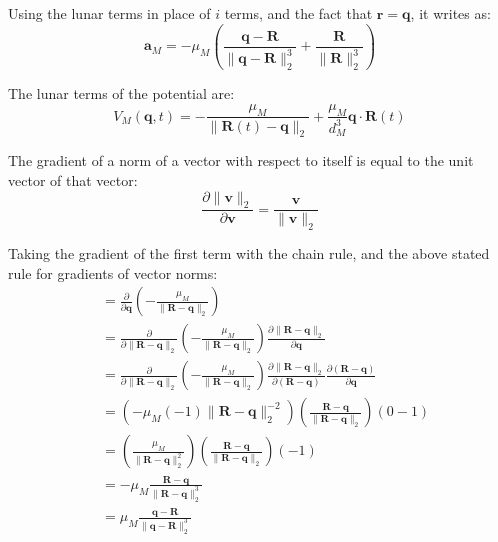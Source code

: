 \documentclass[titlepage]{article}
\begin{document}
Using the lunar terms in place of $i$ terms, and the fact that $\boldsymbol{r}=\boldsymbol{q}$, it writes as:
\begin{equation}
	\boldsymbol{a}_M=-\mu_M\left(\frac{\boldsymbol{q}-\boldsymbol{R}}{\|\boldsymbol{q}-\boldsymbol{R}\|_2^3}+\frac{\boldsymbol{R}}{\|\boldsymbol{R}\|_2^3}\right)
\end{equation}

The lunar terms of the potential are:
\begin{equation}
	V_M(\boldsymbol{q},t)=-\frac{\mu_M}{\|\boldsymbol{R}(t)-\boldsymbol{q}\|_2}+\frac{\mu_M}{d_M^3}\boldsymbol{q}\cdot\boldsymbol{R}(t)
\end{equation}

The gradient of a norm of a vector with respect to itself is equal to the unit vector of that vector:
\begin{equation}
	\frac{\partial\|\boldsymbol{v}\|_2}{\partial\boldsymbol{v}}=\frac{\boldsymbol{v}}{\|\boldsymbol{v}\|_2}
\end{equation}

Taking the gradient of the first term with the chain rule, and the above stated rule for gradients of vector norms:
\begin{equation}
	\begin{split}
		&=\frac{\partial}{\partial\boldsymbol{q}}\left(-\frac{\mu_M}{\|\boldsymbol{R}-\boldsymbol{q}\|_2}\right) \\
		&=\frac{\partial}{\partial\|\boldsymbol{R}-\boldsymbol{q}\|_2}\left(-\frac{\mu_M}{\|\boldsymbol{R}-\boldsymbol{q}\|_2}\right)\frac{\partial\|\boldsymbol{R}-\boldsymbol{q}\|_2}{\partial\boldsymbol{q}} \\
		&=\frac{\partial}{\partial\|\boldsymbol{R}-\boldsymbol{q}\|_2}\left(-\frac{\mu_M}{\|\boldsymbol{R}-\boldsymbol{q}\|_2}\right)\frac{\partial\|\boldsymbol{R}-\boldsymbol{q}\|_2}{\partial(\boldsymbol{R}-\boldsymbol{q})}\frac{\partial(\boldsymbol{R}-\boldsymbol{q})}{\partial\boldsymbol{q}} \\
		&=\left(-\mu_M(-1)\|\boldsymbol{R}-\boldsymbol{q}\|_2^{-2}\right)\left(\frac{\boldsymbol{R}-\boldsymbol{q}}{\|\boldsymbol{R}-\boldsymbol{q}\|_2}\right)\left(0-1\right) \\
		&=\left(\frac{\mu_M}{\|\boldsymbol{R}-\boldsymbol{q}\|_2^2}\right)\left(\frac{\boldsymbol{R}-\boldsymbol{q}}{\|\boldsymbol{R}-\boldsymbol{q}\|_2}\right)\left(-1\right) \\
		&=-\mu_M\frac{\boldsymbol{R}-\boldsymbol{q}}{\|\boldsymbol{R}-\boldsymbol{q}\|_2^3} \\
		&=\mu_M\frac{\boldsymbol{q}-\boldsymbol{R}}{\|\boldsymbol{q}-\boldsymbol{R}\|_2^3}
	\end{split}
\end{equation}
\end{document}

